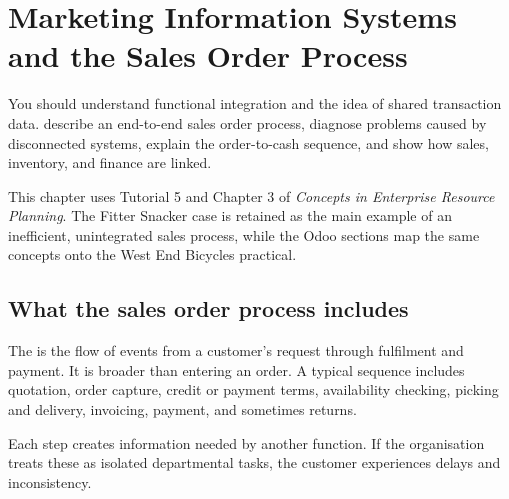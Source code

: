 \chapter{Marketing Information Systems and the Sales Order Process}
\label{ch:sales-order}

\chapterguide
  {You should understand functional integration and the idea of shared transaction data.}
  {describe an end-to-end sales order process, diagnose problems caused by disconnected systems, explain the order-to-cash sequence, and show how sales, inventory, and finance are linked.}

\begin{sourcebasis}
This chapter uses Tutorial 5 and Chapter 3 of \emph{Concepts in Enterprise Resource Planning}. The Fitter Snacker case is retained as the main example of an inefficient, unintegrated sales process, while the Odoo sections map the same concepts onto the West End Bicycles practical.
\end{sourcebasis}

\section{What the sales order process includes}

The  is the flow of events from a customer's request through fulfilment and payment. It is broader than entering an order. A typical sequence includes quotation, order capture, credit or payment terms, availability checking, picking and delivery, invoicing, payment, and sometimes returns.

\begin{erpfigure}
\end{erpfigure}

Each step creates information needed by another function. If the organisation treats these as isolated departmental tasks, the customer experiences delays and inconsistency.

